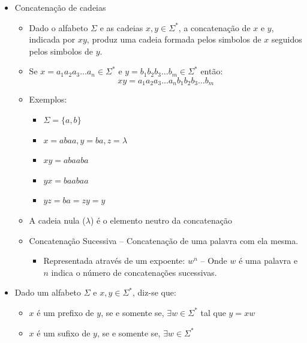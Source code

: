 \documentclass[12pt]{article}
\begin{document}
\begin{itemize}
    \begin{itemize}
        \item Seja $\Sigma$ um alfabeto, então, o fechamento de $\Sigma$ 
        descrito por $\Sigma^*$ é definido como
        \[ \Sigma^*= \Sigma^0 \cup \Sigma^1 \cup \Sigma^2 \cup \ldots \cup 
        \Sigma^n \cup \ldots\] 
    \end{itemize}
    \item Concatenação de cadeias
    \begin{itemize}
        \item Dado o alfabeto \(\Sigma\) e as cadeias \(x,y \in \Sigma^*\), a 
        concatenação de \(x\) e \(y\), indicada por \(xy\), produz uma cadeia 
        formada pelos simbolos de \(x\) seguidos pelos simbolos de \(y\).
        \item Se \(x=a_1a_2a_3 \ldots a_n \in \Sigma^* \) e \(y=b_1b_2b_3 
        \ldots b_m \in \Sigma^* \) então: 
        \[xy=a_1a_2a_3 \ldots a_nb_1b_2b_3 \ldots b_m \]
        \item Exemplos:
        \begin{itemize}[label=]
            \item \(\Sigma=\{a,b\}\)
            \item \(x=abaa, y=ba, z=\lambda\)
            \item \(xy=abaaba\)
            \item \(yx=baabaa\)
            \item \(yz=ba=zy=y\)
        \end{itemize}
        \item A cadeia nula (\(\lambda\)) é o elemento neutro da concatenação
        \item Concatenação Sucessiva -- Concatenação de uma palavra com ela 
        mesma.
        \begin{itemize}
            \item Representada através de um expoente: \(w^n\) -- Onde \(w\) é 
            uma palavra e \(n\) indica o número de concatenações sucessivas.
        \end{itemize}
    \end{itemize}
    \item Dado um alfabeto $\Sigma$ e $x,y\in\Sigma^*$, diz-se que:
    \begin{itemize}
        \item $x$ é um prefixo de $y$, se e somente se, $\exists w\in\Sigma^*$ 
        tal que $y=xw$
        \item $x$ é um sufixo de $y$, se e somente se, $\exists w\in\Sigma^*$ 

\end{itemize}
\end{itemize}
\end{document}
